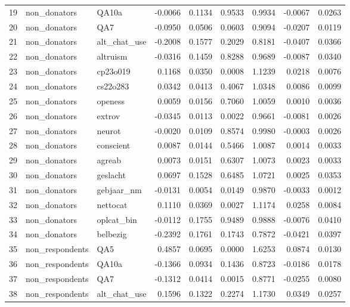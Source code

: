 \begin{table}[ht]
\begin{tabular}{rllrrrrrr}
  19 & non\_donators & QA10a & -0.0066 & 0.1134 & 0.9533 & 0.9934 & -0.0067 & 0.0263 \\ 
  20 & non\_donators & QA7 & -0.0950 & 0.0506 & 0.0603 & 0.9094 & -0.0207 & 0.0119 \\ 
  21 & non\_donators & alt\_chat\_use & -0.2008 & 0.1577 & 0.2029 & 0.8181 & -0.0407 & 0.0366 \\ 
  22 & non\_donators & altruism & -0.0316 & 0.1459 & 0.8288 & 0.9689 & -0.0087 & 0.0340 \\ 
  23 & non\_donators & cp23o019 & 0.1168 & 0.0350 & 0.0008 & 1.1239 & 0.0218 & 0.0076 \\ 
  24 & non\_donators & cs22o283 & 0.0342 & 0.0413 & 0.4067 & 1.0348 & 0.0086 & 0.0099 \\ 
  25 & non\_donators & openess & 0.0059 & 0.0156 & 0.7060 & 1.0059 & 0.0010 & 0.0036 \\ 
  26 & non\_donators & extrov & -0.0345 & 0.0113 & 0.0022 & 0.9661 & -0.0081 & 0.0026 \\ 
  27 & non\_donators & neurot & -0.0020 & 0.0109 & 0.8574 & 0.9980 & -0.0003 & 0.0026 \\ 
  28 & non\_donators & conscient & 0.0087 & 0.0144 & 0.5466 & 1.0087 & 0.0014 & 0.0033 \\ 
  29 & non\_donators & agreab & 0.0073 & 0.0151 & 0.6307 & 1.0073 & 0.0023 & 0.0033 \\ 
  30 & non\_donators & geslacht & 0.0697 & 0.1528 & 0.6485 & 1.0721 & 0.0025 & 0.0353 \\ 
  31 & non\_donators & gebjaar\_nm & -0.0131 & 0.0054 & 0.0149 & 0.9870 & -0.0033 & 0.0012 \\ 
  32 & non\_donators & nettocat & 0.1110 & 0.0369 & 0.0027 & 1.1174 & 0.0258 & 0.0084 \\ 
  33 & non\_donators & oplcat\_bin & -0.0112 & 0.1755 & 0.9489 & 0.9888 & -0.0076 & 0.0410 \\ 
  34 & non\_donators & belbezig & -0.2392 & 0.1761 & 0.1743 & 0.7872 & -0.0421 & 0.0397 \\ 
  35 & non\_respondents & QA5 & 0.4857 & 0.0695 & 0.0000 & 1.6253 & 0.0874 & 0.0130 \\ 
  36 & non\_respondents & QA10a & -0.1366 & 0.0934 & 0.1436 & 0.8723 & -0.0186 & 0.0178 \\ 
  37 & non\_respondents & QA7 & -0.1312 & 0.0414 & 0.0015 & 0.8771 & -0.0255 & 0.0080 \\ 
  38 & non\_respondents & alt\_chat\_use & 0.1596 & 0.1322 & 0.2274 & 1.1730 & 0.0349 & 0.0257 \\ 

\end{tabular}
\end{table}
